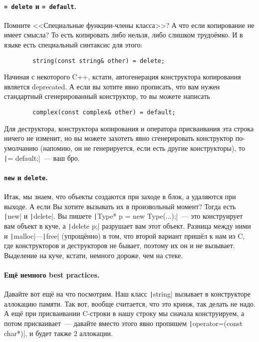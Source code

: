 \documentclass{article}
\begin{document}
    \paragraph{\texttt{= delete} и \texttt{= default}.}
    Помните <<Специальные функции-члены класса>>? А что если копирование не имеет смысла? То есть копировать либо нельзя, либо слишком трудоёмко. И в языке есть специальный синтаксис для этого:
    \begin{verbatim}
        string(const string& other) = delete;
    \end{verbatim}
    Начиная с некоторого C++, кстати, автогенерация конструктора копирования является deprecated. А если вы хотите явно прописать, что вам нужен стандартный сгенерированный конструктор, то вы можете написать
    \begin{verbatim}
        complex(const complex& other) = default;
    \end{verbatim}
    Для деструктора, конструктора копирования и оператора присваивания эта строка ничего не изменит, но вы можете захотеть явно сгенерировать конструктор по-умолчанию (напомню, он не генерируется, если есть другие конструкторы), то \texttt|= default;|~--- ваш бро.
    \paragraph{\texttt{new} и \texttt{delete}.}
    Итак, мы знаем, что объекты создаются при заходе в блок, а удаляются при выходе. А если Вы хотите вызывать их в произвольный момент? Тогда есть \texttt|new| и \texttt|delete|. Вы пишете \texttt|Type* p = new Type(...);|~--- это конструирует вам объект в куче, а \texttt|delete p;| разрушает вам этот объект. Разница между ними и \texttt|malloc|---\texttt|free| (упрощённо) в том, что второй вариант пришёл к нам из C, где конструкторов и деструкторов не бывает, поэтому их он и не вызывает. Выделение на куче, кстати, немного дороже, чем на стеке.
    \paragraph{Ещё немного best practices.}
    Давайте вот ещё на что посмотрим. Наш класс \texttt|string| вызывает в конструкторе аллокацию памяти. Так вот, вообще считается, что это кринж, так делать не надо. А ещё при присваивании C-строки в нашу строку мы сначала конструируем, а потом присваивает~--- давайте вместо этого явно пропишем \texttt|operator=(const char*)|, и будет также 2 аллокации.
\end{document}
